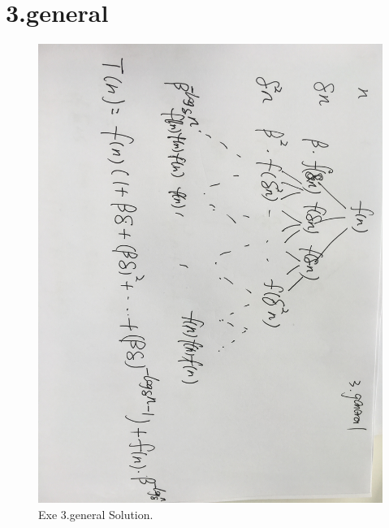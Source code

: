 \section{3.general}
\begin{figure}[H]
  \includegraphics[width=\linewidth]{EXgeneral.jpeg}
  \caption{Exe 3.general Solution.}
  \label{fig:solution 3.general}
\end{figure}

























 
 
 
 
 
 
 
 
 
 
 
 
 
 
 




